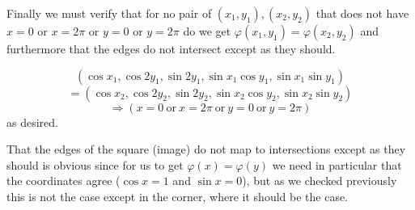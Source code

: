 \documentclass[10pt]{article}
\begin{document}
Finally we must verify that for no pair of $(x_1,y_1), (x_2,y_2)$ that does not have $x=0$ or $ x = 2 \pi$ or $y=0$ or $ y= 2\pi$ do we get $\varphi(x_1,y_1)=\varphi(x_2,y_2)$ and furthermore that the edges do not intersect except as they should.

\[(\cos{x_1}, \cos{2 y_1 }, \sin{2 y_1}, \sin{x_1} \cos{y_1}, \sin{x_1}\sin{y_1}) \]\[= (\cos{x_2}, \cos{2 y_2 }, \sin{2 y_2}, \sin{x_2} \cos{y_2}, \sin{x_2}\sin{y_2}) \]
\[\Rightarrow (x=0 \mathrm{\ or\ } x = 2 \pi \mathrm{\ or\ } y=0 \mathrm{\ or\ } y= 2\pi )\] 
as desired.

That the edges of the square (image) do not map to intersections except as they should is obvious since for us to get $\varphi(x) = \varphi(y)$ we need in particular that the coordinates agree ($\cos{x}=1$ and $\sin{x}=0$), but as we checked previously this is not the case except in the corner, where it should be the case.
\end{document}

